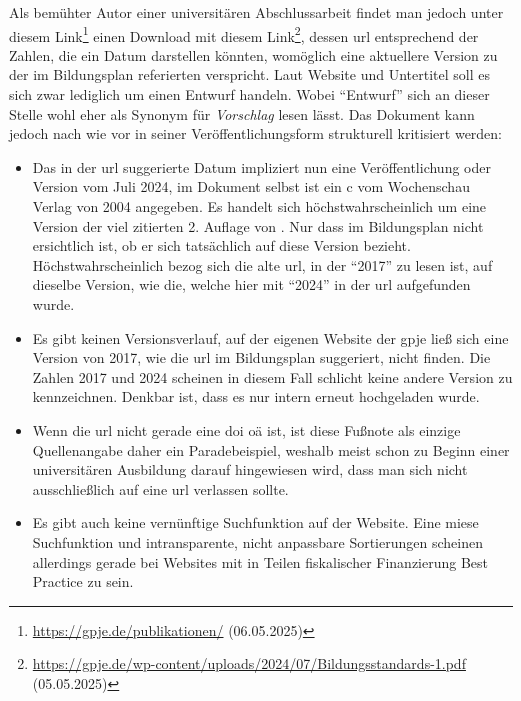 Als bemühter Autor einer universitären Abschlussarbeit findet man jedoch unter diesem Link\footnote{\url{https://gpje.de/publikationen/} (06.05.2025)} einen Download mit diesem Link\footnote{\url{https://gpje.de/wp-content/uploads/2024/07/Bildungsstandards-1.pdf} (05.05.2025)}, dessen \gls{url} entsprechend der Zahlen, die ein Datum darstellen könnten, womöglich eine aktuellere Version zu der im Bildungsplan \autocite[][9]{bplan} referierten verspricht. Laut Website und Untertitel soll es sich zwar lediglich um einen Entwurf handeln. Wobei \enquote{Entwurf} sich an dieser Stelle wohl eher als Synonym für \emph{Vorschlag} lesen lässt.  Das Dokument kann jedoch nach wie vor in seiner Veröffentlichungsform strukturell kritisiert werden:
\begin{itemize}
    \item Das in der \gls{url} suggerierte Datum impliziert nun eine Veröffentlichung oder Version vom Juli 2024, im Dokument selbst ist ein \gls{c} vom Wochenschau Verlag von 2004 angegeben. Es handelt sich höchstwahrscheinlich um eine Version der viel zitierten 2. Auflage von \citeyear[]{gpje2004}. Nur dass im Bildungsplan nicht ersichtlich ist, ob er sich tatsächlich auf diese Version bezieht. Höchstwahrscheinlich bezog sich die alte \gls{url}, in der \enquote{2017} zu lesen ist, auf dieselbe Version, wie die, welche hier mit \enquote{2024} in der \gls{url} aufgefunden wurde. 
    
    
    \item Es gibt keinen Versionsverlauf, auf der eigenen Website der \gls{gpje} ließ sich eine Version von 2017, wie die \gls{url} im Bildungsplan \autocite[][9]{bplan} suggeriert, nicht finden. Die Zahlen 2017 und 2024 scheinen in diesem Fall schlicht keine andere Version zu kennzeichnen. Denkbar ist, dass es nur intern erneut hochgeladen wurde.

    \item Wenn die \gls{url} nicht gerade eine \gls{doi} \gls{oä} ist, ist diese Fußnote als einzige Quellenangabe daher ein Paradebeispiel, weshalb meist schon zu Beginn einer universitären Ausbildung darauf hingewiesen wird, dass man sich nicht ausschließlich auf eine \gls{url} verlassen sollte. 
    
    \item Es gibt auch keine vernünftige Suchfunktion auf der Website. Eine miese Suchfunktion und intransparente, nicht anpassbare Sortierungen scheinen allerdings gerade bei Websites mit in Teilen fiskalischer Finanzierung Best Practice zu sein.
    

\end{itemize}
